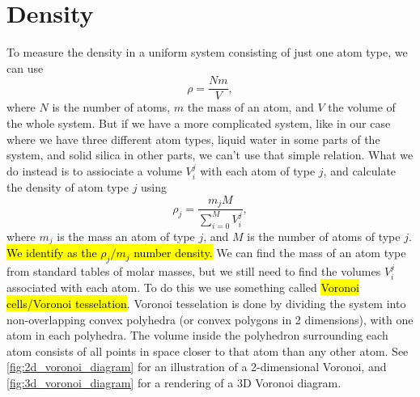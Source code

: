 \FloatBarrier
\section{Density}
To measure the density in a uniform system consisting of just one atom type, we can use
\[
    \rho = \frac{Nm}{V},
\]
where $N$ is the number of atoms, $m$ the mass of an atom, and $V$ the volume of the whole system. But if we have a more complicated system, like in our case where we have three different atom types, liquid water in some parts of the system, and solid silica in other parts, we can't use that simple relation. What we do instead is to assiociate a volume $V_i^j$ with each atom of type $j$, and calculate the density of atom type $j$ using
\[
    \rho_j = \dfrac{m_jM}{\sum_{i=0}^M V_i^j},
\]
where $m_j$ is the mass an atom of type $j$, and $M$ is the number of atoms of type $j$. \hl{We identify as the $\rho_j/m_j$ number density.} We can find the mass of an atom type from standard tables of molar masses, but we still need to find the volumes $V_i^j$ associated with each atom. To do this we use something called \hl{Voronoi cells/Voronoi tesselation}. Voronoi tesselation is done by dividing the system into non-overlapping convex polyhedra (or convex polygons in 2 dimensions), with one atom in each polyhedra. The volume inside the polyhedron surrounding each atom consists of all points in space closer to that atom than any other atom. See \cref{fig:2d_voronoi_diagram} for an illustration of a 2-dimensional Voronoi, and \cref{fig:3d_voronoi_diagram} for a rendering of a 3D Voronoi diagram.
%
